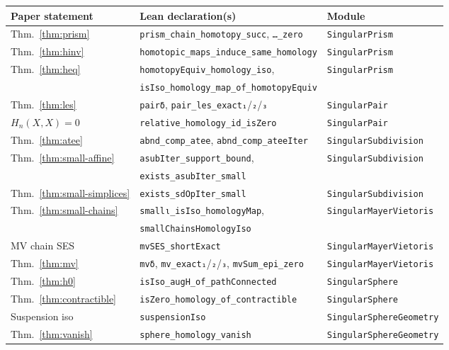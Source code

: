 \documentclass[11pt]{article}
\theoremstyle{remark}
\newcommand{\leanname}[1]{\texttt{#1}}
\begin{document}
\begin{table}[ht]
\centering
\small
\begin{tabular}{@{}lll@{}}
\toprule
Paper statement & Lean declaration(s) & Module \\
\midrule
Thm.~\ref{thm:prism} & \leanname{prism\_chain\_homotopy\_succ}, \leanname{\dots\_zero} & \leanname{SingularPrism} \\
Thm.~\ref{thm:hinv} & \leanname{homotopic\_maps\_induce\_same\_homology} & \leanname{SingularPrism} \\
Thm.~\ref{thm:heq} & \leanname{homotopyEquiv\_homology\_iso}, & \leanname{SingularPrism} \\
 & \leanname{isIso\_homology\_map\_of\_homotopyEquiv} & \\
Thm.~\ref{thm:les} & \leanname{pairδ}, \leanname{pair\_les\_exact₁}/\leanname{₂}/\leanname{₃} & \leanname{SingularPair} \\
$H_n(X,X)=0$ & \leanname{relative\_homology\_id\_isZero} & \leanname{SingularPair} \\
Thm.~\ref{thm:atee} & \leanname{abnd\_comp\_atee}, \leanname{abnd\_comp\_ateeIter} & \leanname{SingularSubdivision} \\
Thm.~\ref{thm:small-affine} & \leanname{asubIter\_support\_bound}, & \leanname{SingularSubdivision} \\
 & \leanname{exists\_asubIter\_small} & \\
Thm.~\ref{thm:small-simplices} & \leanname{exists\_sdOpIter\_small} & \leanname{SingularSubdivision} \\
Thm.~\ref{thm:small-chains} & \leanname{smallι\_isIso\_homologyMap}, & \leanname{SingularMayerVietoris} \\
 & \leanname{smallChainsHomologyIso} & \\
MV chain SES & \leanname{mvSES\_shortExact} & \leanname{SingularMayerVietoris} \\
Thm.~\ref{thm:mv} & \leanname{mvδ}, \leanname{mv\_exact₁}/\leanname{₂}/\leanname{₃}, \leanname{mvSum\_epi\_zero} & \leanname{SingularMayerVietoris} \\
Thm.~\ref{thm:h0} & \leanname{isIso\_augH\_of\_pathConnected} & \leanname{SingularSphere} \\
Thm.~\ref{thm:contractible} & \leanname{isZero\_homology\_of\_contractible} & \leanname{SingularSphere} \\
Suspension iso & \leanname{suspensionIso} & \leanname{SingularSphereGeometry} \\
Thm.~\ref{thm:vanish} & \leanname{sphere\_homology\_vanish} & \leanname{SingularSphereGeometry} \\

\end{tabular}
\end{table}
\end{document}
